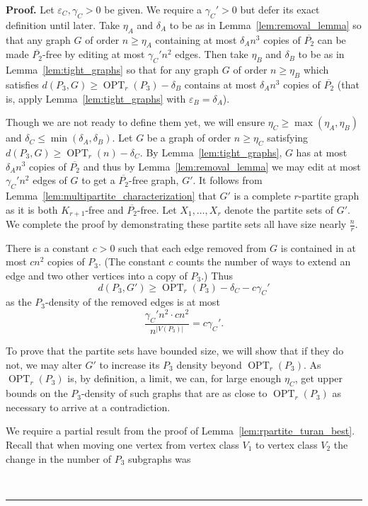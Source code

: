 \documentclass[12pt]{article}
\DeclareMathOperator{\OPT}{OPT}
\renewenvironment{proof}[1][Proof]{\textbf{#1.} }{\ \rule{0.5em}{0.5em}}
\begin{document}
\begin{proof}
Let $\varepsilon_C, \gamma_C > 0$ be given. We require a
$\gamma_C' > 0$ but defer its exact definition until later. Take
$\eta_A$ and $\delta_A$ to be as in Lemma~\ref{lem:removal_lemma} so that any
graph $G$ of order $n \ge \eta_A$ containing at most $\delta_A n^3$ copies of
$\overline{P_2}$ can be made $\overline{P_2}$-free by editing at most
$\gamma_C' n^2$ edges. Then take $\eta_B$ and $\delta_B$ to be as in
Lemma~\ref{lem:tight_graphs} so that for any graph $G$ of order $n \ge \eta_B$
which satisfies $d(P_3,G) \ge \OPT_r(P_3)-\delta_B$ contains at most $\delta_A
n^3$ copies of $\overline{P_2}$ (that is, apply Lemma~\ref{lem:tight_graphs}
with $\varepsilon_B = \delta_A$).

Though we are not ready to define them yet, we will ensure $\eta_C \ge
\max(\eta_A, \eta_B)$ and $\delta_C \le \min(\delta_A,\delta_B)$. Let $G$ be a
graph of order $n \ge \eta_C$ satisfying $d(P_3,G) \ge \OPT_r(n)-\delta_C$. By
Lemma~\ref{lem:tight_graphs}, $G$ has at most $\delta_An^3$ copies of
$\overline{P_2}$ and thus by Lemma~\ref{lem:removal_lemma} we may edit at most
$\gamma_C' n^2$ edges of $G$ to get a $\overline{P_2}$-free graph, $G'$. It
follows from Lemma~\ref{lem:multipartite_characterization} that $G'$ is a
complete $r$-partite graph as it is both $K_{r+1}$-free and
$\overline{P_2}$-free. Let $X_1,\dots,X_r$ denote the partite sets of $G'$.
We complete the proof by demonstrating these partite sets all have size nearly
$\frac{n}{r}$.

There is a constant $c > 0$ such that each edge removed from $G$ is contained in at most
$cn^2$ copies of $P_3$. (The constant $c$ counts the number of ways to extend an
edge and two other vertices into a copy of $P_3$.) Thus
\[ d(P_3,G') \geq \OPT_r(P_3) - \delta_C - c\gamma_C' \]
as the $P_3$-density of the removed edges is at most
\[ \frac{\gamma_C' n^2\cdot c n^2}{n^{|V(P_3)|}} =
c\gamma_C'. \]

To prove that the partite sets have bounded size, we will show that if they do
not, we may alter $G'$ to increase its $P_3$ density beyond $\OPT_r(P_3)$.
As $\OPT_r(P_3)$ is, by definition, a limit, we can, for large enough $\eta_C$,
get upper bounds on the $P_3$-density of such graphs that are as close to
$\OPT_r(P_3)$ as necessary to arrive at a contradiction.

We require a partial result from the proof of
Lemma~\ref{lem:rpartite_turan_best}. Recall that when moving one vertex from
vertex class $V_1$ to vertex class $V_2$ the change in the number of $P_3$
subgraphs was


\end{proof}
\end{document}

